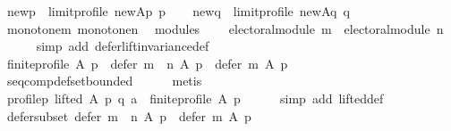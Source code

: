 \begin{isabellebody}
\ {\isacharquery}{\kern0pt}new{\isacharunderscore}{\kern0pt}p\ {\isacharequal}{\kern0pt}\ {\isachardoublequoteopen}limit{\isacharunderscore}{\kern0pt}profile\ {\isacharquery}{\kern0pt}new{\isacharunderscore}{\kern0pt}Ap\ p{\isachardoublequoteclose}\isanewline
\ \ \isamarkupfalse%
\ {\isacharquery}{\kern0pt}new{\isacharunderscore}{\kern0pt}q\ {\isacharequal}{\kern0pt}\ {\isachardoublequoteopen}limit{\isacharunderscore}{\kern0pt}profile\ {\isacharquery}{\kern0pt}new{\isacharunderscore}{\kern0pt}Aq\ q{\isachardoublequoteclose}\isanewline
\ \ \isamarkupfalse%
\ monotone{\isacharunderscore}{\kern0pt}m\ monotone{\isacharunderscore}{\kern0pt}n\ \isamarkupfalse%
\ modules{\isacharcolon}{\kern0pt}\isanewline
\ \ \ \ {\isachardoublequoteopen}electoral{\isacharunderscore}{\kern0pt}module\ m\ {\isasymand}\ electoral{\isacharunderscore}{\kern0pt}module\ n{\isachardoublequoteclose}\isanewline
\ \ \ \ \isamarkupfalse%
\ {\isacharparenleft}{\kern0pt}simp\ add{\isacharcolon}{\kern0pt}\ defer{\isacharunderscore}{\kern0pt}lift{\isacharunderscore}{\kern0pt}invariance{\isacharunderscore}{\kern0pt}def{\isacharparenright}{\kern0pt}\isanewline
\ \ \isamarkupfalse%
\ {\isachardoublequoteopen}finite{\isacharunderscore}{\kern0pt}profile\ A\ p\ {\isasymlongrightarrow}\ defer\ {\isacharparenleft}{\kern0pt}m\ {\isasymtriangleright}\ n{\isacharparenright}{\kern0pt}\ A\ p\ {\isasymsubseteq}\ defer\ m\ A\ p{\isachardoublequoteclose}\isanewline
\ \ \ \ \isamarkupfalse%
\ seq{\isacharunderscore}{\kern0pt}comp{\isacharunderscore}{\kern0pt}def{\isacharunderscore}{\kern0pt}set{\isacharunderscore}{\kern0pt}bounded\isanewline
\ \ \ \ \isamarkupfalse%
\ metis\isanewline
\ \ \isamarkupfalse%
\ \isamarkupfalse%
\ profile{\isacharunderscore}{\kern0pt}p{\isacharcolon}{\kern0pt}\ {\isachardoublequoteopen}lifted\ A\ p\ q\ a\ {\isasymlongrightarrow}\ finite{\isacharunderscore}{\kern0pt}profile\ A\ p{\isachardoublequoteclose}\isanewline
\ \ \ \ \isamarkupfalse%
\ {\isacharparenleft}{\kern0pt}simp\ add{\isacharcolon}{\kern0pt}\ lifted{\isacharunderscore}{\kern0pt}def{\isacharparenright}{\kern0pt}\isanewline
\ \ \isamarkupfalse%
\ \isamarkupfalse%
\ defer{\isacharunderscore}{\kern0pt}subset{\isacharcolon}{\kern0pt}\ {\isachardoublequoteopen}defer\ {\isacharparenleft}{\kern0pt}m\ {\isasymtriangleright}\ n{\isacharparenright}{\kern0pt}\ A\ p\ {\isasymsubseteq}\ defer\ m\ A\ p{\isachardoublequoteclose}\isanewline

\end{isabellebody}
